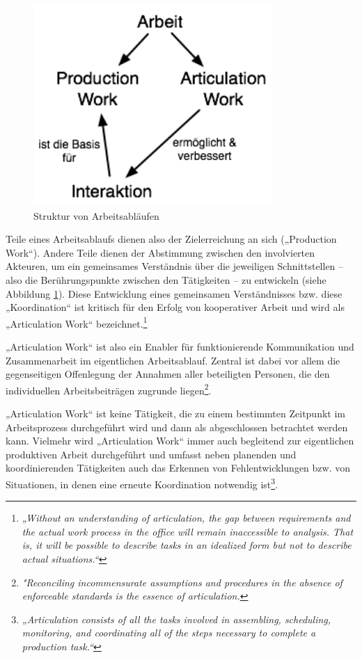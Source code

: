 \begin{figure}[htbp]
	\centering
		\includegraphics[height=3in]{img/ArticulationWork/ArbeitInteraktion.png}
	\caption{Struktur von Arbeitsabläufen}
	\label{fig:img_ArticulationWork_ArbeitInteraktion}
\end{figure}

Teile eines Arbeitsablaufs dienen also der Zielerreichung an sich („Production Work“). Andere Teile dienen der Abstimmung zwischen den involvierten Akteuren, um ein gemeinsames Verständnis über die jeweiligen Schnittstellen -- also die Berührungspunkte zwischen den Tätigkeiten -- zu entwickeln (siehe Abbildung \ref{fig:img_ArticulationWork_ArbeitInteraktion}). Diese Entwicklung eines gemeinsamen Verständnisses bzw. diese „Koordination“ ist kritisch für den Erfolg von kooperativer Arbeit \citep{Strauss93} und wird als „Articulation Work“ bezeichnet.\footnote{\emph{„Without an understanding of articulation, the gap between requirements and the actual work process in the office will remain inaccessible to analysis. That is, it will be possible to describe tasks in an idealized form but not to describe actual situations.“}\citep{Gerson86}} 

„Articulation Work“ ist also ein Enabler für funktionierende Kommunikation und Zusammenarbeit im eigentlichen Arbeitsablauf. Zentral ist dabei vor allem die gegenseitigen Offenlegung der Annahmen aller beteiligten Personen, die den individuellen Arbeitsbeiträgen zugrunde liegen\footnote{\emph{"Reconciling incommensurate assumptions and procedures in the absence of enforceable standards is the essence of articulation.}\citep[][S. 266]{Gerson86}}. 

„Articulation Work“ ist keine Tätigkeit, die zu einem bestimmten Zeitpunkt im Arbeitsprozess durchgeführt wird und dann als abgeschlossen betrachtet werden kann. Vielmehr wird „Articulation Work“ immer auch begleitend zur eigentlichen produktiven Arbeit durchgeführt und umfasst neben planenden und koordinierenden Tätigkeiten auch das Erkennen von Fehlentwicklungen bzw. von Situationen, in denen eine erneute Koordination notwendig ist\footnote{\emph{„Articulation consists of all the tasks involved in assembling, scheduling, monitoring, and coordinating all of the steps necessary to complete a production task.“}\citep[][S. 266]{Gerson86}}. 

